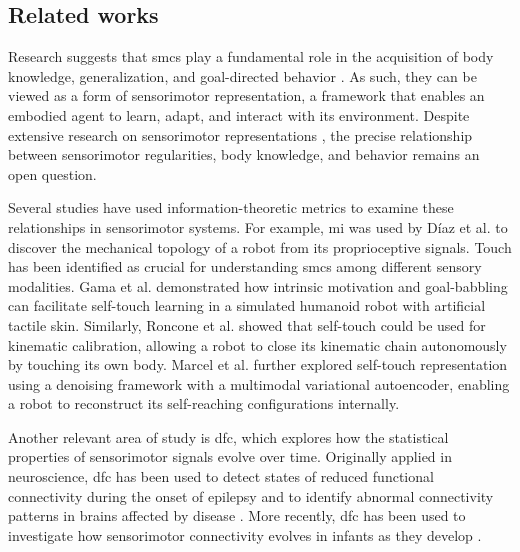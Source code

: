 \documentclass[letterpaper, 10 pt, conference]{ieeeconf}  %
\begin{document}
\subsection{Related works}
Research suggests that \acp{smc} play a fundamental role in the acquisition of body knowledge, generalization, and goal-directed behavior \cite{Jacquey2019Sensorimotorcontingenciesas}. As such, they can be viewed as a form of sensorimotor representation, a framework that enables an embodied agent to learn, adapt, and interact with its environment. Despite extensive research on sensorimotor representations \cite{Nguyen2021Sensorimotorrepresentationlearning}, the precise relationship between sensorimotor regularities, body knowledge, and behavior remains an open question.

Several studies have used information-theoretic metrics to examine these relationships in sensorimotor systems. 
For example, \ac{mi} was used by D\'iaz et al. \cite{DiazLedezma2023MachineLS} to discover the mechanical topology of a robot from its proprioceptive signals. Touch has been identified as crucial for understanding \acp{smc} among different sensory modalities. Gama et al. \cite{Gama2021Goaldirectedtactile} demonstrated how intrinsic motivation and goal-babbling can facilitate self-touch learning in a simulated humanoid robot with artificial tactile skin. Similarly, Roncone et al. \cite{Roncone2014Automatickinematicchain} showed that self-touch could be used for kinematic calibration, allowing a robot to close its kinematic chain autonomously by touching its own body. Marcel et al. \cite{Marcel2022Learningreachown} further explored self-touch representation using a denoising framework with a multimodal variational autoencoder, enabling a robot to reconstruct its self-reaching configurations internally.

Another relevant area of study is \ac{dfc}, which explores how the statistical properties of sensorimotor signals evolve over time. Originally applied in neuroscience, \ac{dfc} has been used to detect states of reduced functional connectivity during the onset of epilepsy \cite{Christiaen2020Dynamicfunctionalconnectivity} and to identify abnormal connectivity patterns in brains affected by disease \cite{Zhou2020Earlychildhooddevelopmental}. More recently, \ac{dfc} has been used to investigate how sensorimotor connectivity evolves in infants as they develop \cite{Kanazawa2023Openendedmovements}.
\end{document}

